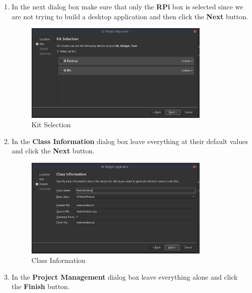 \documentclass{article}
\begin{document}
\begin{enumerate}[1.)]
		\item In the next dialog box make sure that only the \textbf{RPi} box is selected since we are not trying to build a desktop application and then click the \textbf{Next} button.
		
			\begin{figure}[H]
				\centering
				\includegraphics[width=0.85\textwidth]{pics/Kit_Selection.png}
				\caption{Kit Selection}
				\label{Kit_Selection}
			\end{figure}	
		
		\item In the \textbf{Class Information} dialog box leave everything at their default values and click the \textbf{Next} button.
		
			\begin{figure}[H]
				\centering
				\includegraphics[width=0.85\textwidth]{pics/Class_Info.png}
				\caption{Class Information}
				\label{Class_Info}
			\end{figure}		
		
		\item In the \textbf{Project Management} dialog box leave everything alone and click the \textbf{Finish} button.
		

\end{enumerate}
\end{document}
